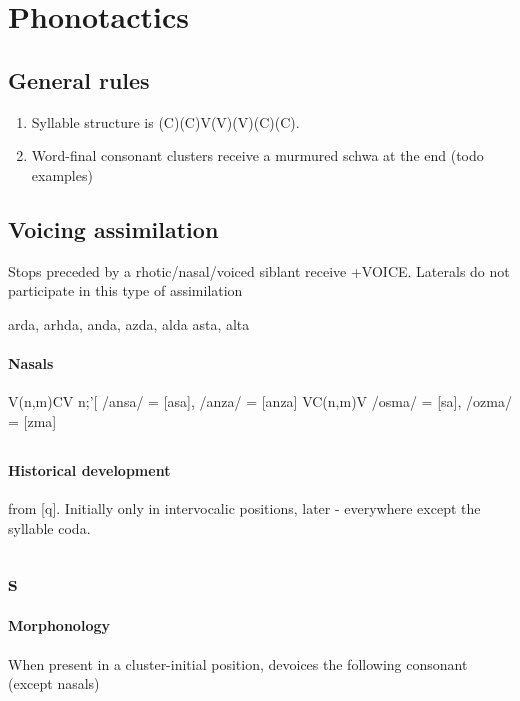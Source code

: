 \documentclass[8pt]{book}
\begin{document}
\section{Phonotactics}
\subsection{General rules}
\begin{enumerate}
	\item Syllable structure is (C)(C)V(V)(V)(C)(C).
	\item Word-final consonant clusters receive a murmured schwa at the end (todo examples)
\end{enumerate}


\subsection{Voicing assimilation}
Stops preceded by a rhotic/nasal/voiced siblant receive +VOICE. Laterals do not participate in this type of assimilation
\begin{exe}
	\ex arda, arhda, anda, azda, alda
	\ex asta, alta
	
\end{exe}

\paragraph{Nasals}

\begin{exe}
\ex V(n,m)CV \textrightarrow n;'[ /ansa/ = [asa], /anza/ = [anza]
\ex VC(n,m)V \textrightarrow /osma/ = [\textopeno sa], /ozma/ = [\textopeno zma] 
\end{exe}

\subsection{}
\paragraph{Historical development} from [q]. Initially only in intervocalic positions, later - everywhere except the syllable coda.

\subsection{s}
\paragraph{Morphonology} When present in a cluster-initial position, devoices the following consonant (except nasals)
\end{document}
